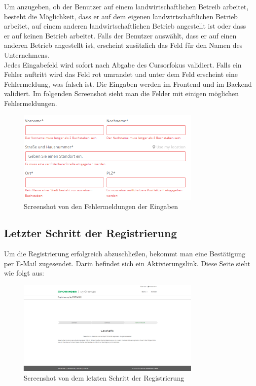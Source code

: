 Um anzugeben, ob der Benutzer auf einem landwirtschaftlichen Betreib arbeitet, besteht die Möglichkeit, dass er auf dem eigenen landwirtschaftlichen Betrieb arbeitet, auf einem anderen landwirtschaftlichen Betrieb angestellt ist oder dass er auf keinen Betrieb arbeitet. Falls der Benutzer auswählt, dass er auf einen anderen Betrieb angestellt ist, erscheint zusätzlich das Feld für den Namen des Unternehmens.\\

Jedes Eingabefeld wird sofort nach Abgabe des Cursorfokus validiert. Falls ein Fehler auftritt wird das Feld rot umrandet und unter dem Feld erscheint eine Fehlermeldung, was falsch ist. Die Eingaben werden im Frontend und im Backend validiert. Im folgenden Screenshot sieht man die Felder mit einigen möglichen Fehlermeldungen.
\begin{figure}[H]
	\centerline{
		\includegraphics[width=0.8\textwidth]{./grafiken/dateneingabe_Errors.PNG}
	}
	\vskip0pt
	\caption{Screenshot von den Fehlermeldungen der Eingaben} \label{fig:eingabeError}
\end{figure}

\subsection{Letzter Schritt der Registrierung}
Um die Registrierung erfolgreich abzuschließen, bekommt man eine Bestätigung per E-Mail zugesendet. Darin befindet sich ein Aktivierungslink. Diese Seite sieht wie folgt aus:
\begin{figure}[H]
	\centerline{
		\includegraphics[width=0.8\textwidth]{./grafiken/erm_register_final.png}
	}
	\vskip0pt
	\caption{Screenshot von dem letzten Schritt der Registrierung} \label{fig:step3register}
\end{figure}

